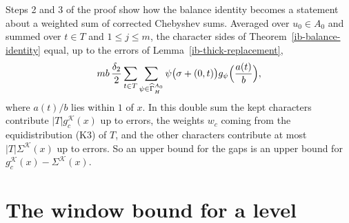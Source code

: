 \begin{remark}\label{ib-window-bound-shape}
Steps 2 and 3 of the proof show how the balance identity becomes a statement
about a weighted sum of corrected Chebyshev sums. Averaged over $u_0\in A_0$ and summed over
$t\in T$ and $1\leq j\leq m$, the character sides of
Theorem~\ref{ib-balance-identity} equal, up to the errors of
Lemma~\ref{ib-thick-replacement},
\[
 mb\,\frac{\delta_2}2\sum_{t\in T}\sum_{\psi\in\widehat\Gamma_H^{A_0}}
 \psi\bigl(\sigma+(0,t)\bigr)g_\psi\Bigl(\frac{a(t)}b\Bigr),
\]
where $a(t)/b$ lies within $1$ of $x$. In this double sum the kept characters
contribute $|T|g^{\mathcal K}_c(x)$ up to errors, the weights $w_c$ coming from
the equidistribution (K3) of $T$, and the other characters contribute at most
$|T|\Sigma^{\mathcal K}(x)$ up to errors. So an upper bound for the gaps is an
upper bound for $g^{\mathcal K}_c(x)-\Sigma^{\mathcal K}(x)$.
\end{remark}

\section{The window bound for a level}\label{section-ib-level}

